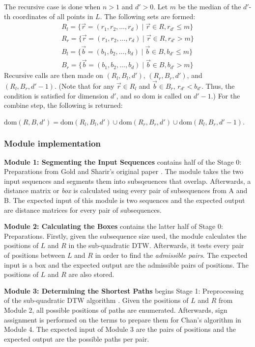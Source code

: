 The recursive case is done when $n>1$ and $d'>0$. Let $m$ be the median of the $d'$-th coordinates of all points in $L$. The following sets are formed:
\begin{align*}
    R_{l} = \{\vec{r}=(r_1,r_2,\dotsc,r_d)\mid\vec{r} \in R, r_{d'}\le m\} \\
    R_{r} = \{\vec{r}=(r_1,r_2,\dotsc,r_d)\mid\vec{r} \in R, r_{d'}> m\}   \\
    B_{l} = \{\vec{b}=(b_1,b_2,\dotsc,b_d)\mid\vec{b} \in B, b_{d'}\le m\} \\
    B_{r} = \{\vec{b}=(b_1,b_2,\dotsc,b_d)\mid\vec{b} \in B, b_{d'}> m\}
\end{align*}
Recursive calls are then made on $(R_l,B_l,d')$, $(R_r,B_r,d')$, and $(R_l,B_r,d'-1)$. (Note that for any $\vec{r}\in R_l$ and $\vec{b}\in B_r$, $r_{d'}<b_{d'}$. Thus, the condition is satisfied for dimension $d'$, and so dom is called on $d'-1$.)
For the combine step, the following is returned:

$\text{dom}(R,B,d')=\text{dom}(R_l,B_l,d')\cup \text{dom}(R_r,B_r,d') \cup \text{dom}(R_l,B_r,d'-1).$

\subsubsection{Module implementation}
\textbf{Module 1: Segmenting the Input Sequences} contains half of the Stage 0: Preparations from Gold and Sharir's original paper \cite{OmerGold}. The module takes the two input sequences and segments them into subsqeuences that overlap. Afterwards, a distance matrix or \textit{box} is calculated using every pair of subsequences from A and B. The expected input of this module is two sequences and the expected output are distance matrices for every pair of subsequences.

\textbf{Module 2: Calculating the Boxes} contains the latter half of Stage 0: Preparations. Firstly, given the subsequence size used, the module calculates the positions of $L$ and $R$ in the sub-quadratic DTW. Afterwards, it tests every pair of positions between $L$ and $R$ in order to find the \textit{admissible pairs}. The expected input is a box and the expected output are the admissible pairs of positions. The positions of $L$ and $R$ are also stored.

\textbf{Module 3: Determining the Shortest Paths} begins Stage 1: Preprocessing of the sub-quadratic DTW algorithm \cite{OmerGold}. Given the positions of $L$ and $R$ from Module 2, all possible positions of paths are enumerated. Afterwards, sign assignment is performed on the terms to prepare them for Chan's algorithm in Module 4. The expected input of Module 3 are the pairs of positions and the expected output are the possible paths per pair.

